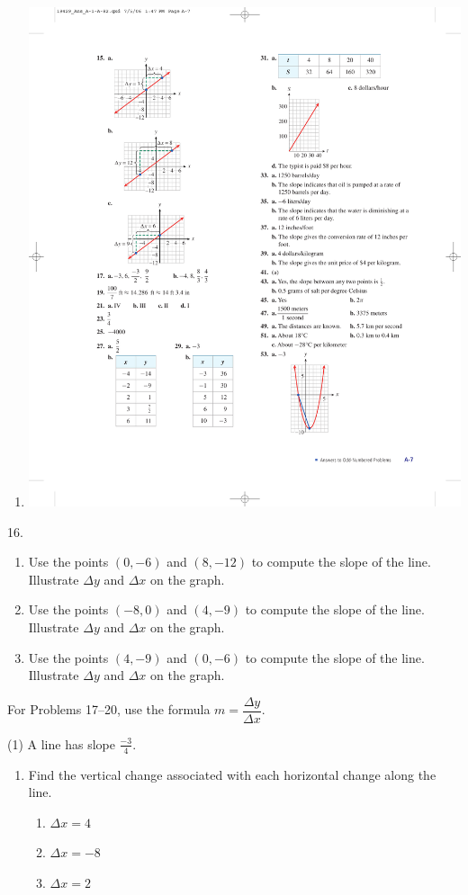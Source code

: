 \documentclass[10pt,]{book}
\theoremstyle{plain}
\theoremstyle{definition}
\theoremstyle{definition}
\theoremstyle{definition}
\theoremstyle{definition}
\numberwithin{equation}{part}
\begin{document}
\begin{exerciselist}
\begin{enumerate}[label=*\alph**]
%
\item\hypertarget{li-946}{}\includegraphics[width=0.4\linewidth]{images/fig-ans-1-4-15c}
%
\end{enumerate}
%
\item[16.]\hypertarget{exercise-231}{}\leavevmode%
\begin{enumerate}[label=*\alph**]
\item\hypertarget{li-947}{}Use the points \((0, -6)\) and \((8, -12)\) to compute the slope of the line. Illustrate \(\Delta y\) and \(\Delta x\) on the graph.%
\item\hypertarget{li-948}{}Use the points \((-8, 0)\) and \((4, -9)\) to compute the slope of the line. Illustrate \(\Delta y\) and \(\Delta x\) on the graph.%
\item\hypertarget{li-949}{}Use the points \((4, -9)\) and \((0, -6)\) to compute the slope of the line. Illustrate \(\Delta y\) and \(\Delta x\) on the graph.%
\end{enumerate}
%
\par\smallskip
\hypertarget{exercisegroup-28}{}\par\noindent For Problems 17–20, use the formula \(m=\dfrac{\Delta y}{\Delta x} \).%
\begin{exercisegroup}(1)
\exercise[17.]\hypertarget{exercise-232}{}A line has slope \(\frac{-3}{4}\). \leavevmode%
\begin{enumerate}[label=*\alph**]
\item\hypertarget{li-950}{}Find the vertical change associated with each horizontal change along the line. %
\begin{multicols}{2}
\begin{enumerate}[label=*\roman**]
\item\hypertarget{li-951}{}\(\Delta x = 4\)%
\item\hypertarget{li-952}{}\(\Delta x = -8\)%
\item\hypertarget{li-953}{}\(\Delta x = 2\)%

\end{enumerate}
\end{multicols}
\end{enumerate}
\end{exercisegroup}
\end{exerciselist}
\end{document}
